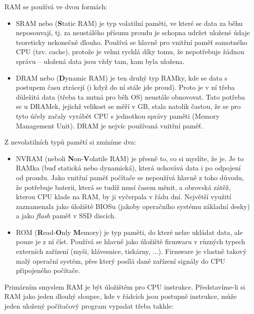 \documentclass[a4paper,11pt]{article}
\begin{document}
RAM se používá ve dvou formách:
\begin{itemize}
 \item SRAM nebo (\textbf{S}tatic RAM) je typ volatilní paměti, ve které se data
  za běhu neposouvají, tj. za neustálého přísunu proudu je schopna udržet
  uložené údaje teoreticky nekonečně dlouho. Používá se hlavně pro vnitřní paměť
  samotného CPU (tzv. cache), protože je velmi rychlá díky tomu, že nepotřebuje
  žádnou správu -- uložená data jsou vždy tam, kam byla uložena.
 \item DRAM nebo (\textbf{D}ynamic RAM) je ten druhý typ RAMky, kde se data s
  postupem času ztrácejí (i když do ní stále jde proud). Proto je v ní třeba
  důležitá data (třeba ta nutná pro běh OS) neustále obnovovat. Tato potřeba se
  u DRAMek, jejichž velikost se měří v GB, stala natolik častou, že se pro tyto
  účely začaly vyrábět CPU s jednotkou správy paměti (Memory Management Unit).
  DRAM je nejvíc používaná vnitřní paměť.
\end{itemize}

Z nevolatilních typů pamětí si zmíníme dva:
\begin{itemize}
 \item NVRAM (neboli \textbf{N}on-\textbf{V}olatile RAM) je přesně to, co si
  myslíte, že je. Je to RAMka (buď statická nebo dynamická), která uchovává data
  i po odpojení od proudu. Jako vnitřní paměť počítače se nepoužívá hlavně z
  toho důvodu, že potřebuje baterii, která se tudíž musí časem měnit, a obrovská
  zátěž, kterou CPU klade na RAM, by ji vyčerpala v řádu dní. Největší využití
  zaznamenala jako úložiště BIOSu (jakoby operačního systému základní desky) a
  jako \emph{flash} paměť v SSD discích.
 \item ROM (\textbf{R}ead-\textbf{O}nly \textbf{M}emory) je typ paměti, do které
  nelze ukládat data, ale pouze je z ní číst. Používá se hlavně jako úložiště
  firmwaru v různých typech externích zařízení (myši, klávesnice, tiskárny,
  ...). Firmware je vlastně takový malý operační systém, přes který posílá dané
  zařízení signály do CPU připojeného počítače.
\end{itemize}

Primárním smyslem RAM je být úložištěm pro CPU instrukce. Představíme-li si RAM
jako jeden dlouhý sloupec, kde v řádcích jsou postupně instrukce, může jeden
uložený počítačový program vypadat třeba takhle:
\end{document}
